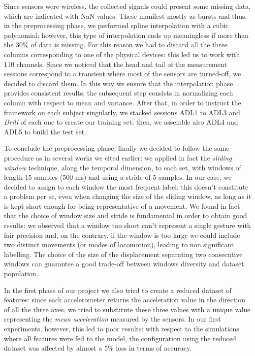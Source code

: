 Since sensors were wireless, the collected signals could present some missing data, which are indicated with NaN values. These manifest mostly as bursts and thus, in the preprocessing phase, we performed spline interpolation with a cubic polynomial; however, this type of interpolation ends up meaningless if more than the 30\% of data is missing. For this reason we had to discard all the three columns corresponding to one of the physical devices: this led us to work with 110 channels. Since we noticed that the head and tail of the measurement sessions correspond to a transient where most of the sensors are turned-off, we decided to discard them. In this way we ensure that the interpolation phase provides consistent results; the subsequent step consists in normalizing each column with respect to mean and variance. After that, in order to instruct the framework on each subject singularly, we stacked sessions ADL1 to ADL3 and \textit{Drill} of each one to create our training set; then, we assemble also ADL4 and ADL5 to build the test set. 

To conclude the preprocessing phase, finally we decided to follow the same procedure as in several works we cited earlier: we applied in fact the \textit{sliding window} technique, along the temporal dimension, to each set, with windows of length 15 samples (500 ms) and using a stride of 5 samples. In our case, we decided to assign to each window the most frequent label: this doesn't constitute a problem per se, even when changing the size of the sliding window, as long as it is kept short enough for being representative of a movement.
We found in fact that the choice of window size and stride is fundamental in order to obtain good results: we observed that a window too short can't represent a single gesture with fair precision and, on the contrary, if the window is too large we could include two distinct movements (or modes of locomotion), leading to non significant labelling. The choice of the size of the displacement separating two consecutive windows can guarantee a good trade-off between windows diversity and dataset population.

In the first phase of our project we also tried to create a reduced dataset of features: since each accelerometer returns the acceleration value in the direction of all the three axes, we tried to substitute these three values with a unique value representing the \textit{mean acceleration} measured by the sensors. In our first experiments, however, this led to poor results: with respect to the simulations where all features were fed to the model, the configuration using the reduced dataset was affected by almost a 5\% loss in terms of accuracy. 


